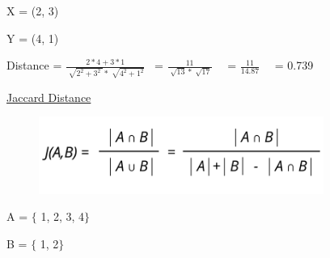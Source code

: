 \documentclass[12pt]{article}
\renewcommand{\_}{\kern-1.5pt\textunderscore\kern-1.5pt}
\begin{document}

\par

{\fontsize{14pt}{16.8pt}\selectfont X = (2, 3)\par}\par

{\fontsize{14pt}{16.8pt}\selectfont Y = (4, 1)\par}\par

{\fontsize{14pt}{16.8pt}\selectfont Distance =  \( \frac{2\ast4+3\ast1}{\sqrt[]{2^{2}+ 3^{2}~}\ast \sqrt[]{4^{2}+ 1^{2}}} \) \  =  \( \frac{11}{\sqrt[]{13} \ast \sqrt[]{17}} \) \ \  =  \( \frac{11}{14.87} \) \ \  = 0.739\par}\par


\vspace{\baselineskip}

\vspace{\baselineskip}

\vspace{\baselineskip}
{\fontsize{14pt}{16.8pt}\selectfont \uline{Jaccard Distance}\par}\par




\begin{figure}[H]
	\begin{Center}
		\includegraphics[width=3.67in,height=0.99in]{./media/image9.png}
	\end{Center}
\end{figure}



\par

{\fontsize{14pt}{16.8pt}\selectfont A = $ \{ $ 1, 2, 3, 4$ \} $ \par}\par

{\fontsize{14pt}{16.8pt}\selectfont B = $ \{ $ 1, 2$ \} $ \par}\par
\end{document}
